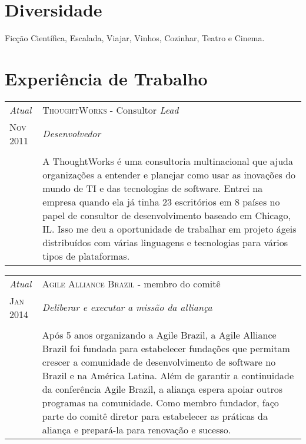 \documentclass[letter,10pt]{article}
\begin{document}
\section{Diversidade}

Ficção Científica, Escalada, Viajar, Vinhos, Cozinhar, Teatro e Cinema.

\section{Experiência de Trabalho}

\begin{tabular}{p{2.5cm}|p{13.5cm}}
  \emph{Atual} & \textsc{ThoughtWorks} - Consultor \textit{Lead}\\
  \textsc{Nov 2011}& \emph{Desenvolvedor}\\
  &\\
  &A ThoughtWorks é uma consultoria multinacional que ajuda organizações a entender e planejar como usar as inovações do mundo de TI e das tecnologias de software. Entrei na empresa quando ela já tinha 23 escritórios em 8 países no papel de consultor de desenvolvimento baseado em Chicago, IL. Isso me deu a oportunidade de trabalhar em projeto ágeis distribuídos com várias linguagens e tecnologias para vários tipos de plataformas.
\end{tabular}

\begin{tabular}{p{2.5cm}|p{13.5cm}}
  \emph{Atual} & \textsc{Agile Alliance Brazil} - membro do comitê\\
  \textsc{Jan 2014}& \emph{Deliberar e executar a missão da alliança}\\
  &\\
  & Após 5 anos organizando a Agile Brazil, a Agile Alliance Brazil foi
  fundada para estabelecer fundações que permitam crescer a comunidade
  de desenvolvimento de software no Brazil e na América Latina. Além de
  garantir a continuidade da conferência Agile Brazil, a aliança espera
  apoiar outros programas na comunidade. Como membro fundador, faço parte
  do comitê diretor para estabelecer as práticas da aliança e prepará-la
  para renovação e sucesso.
\end{tabular}
\end{document}
